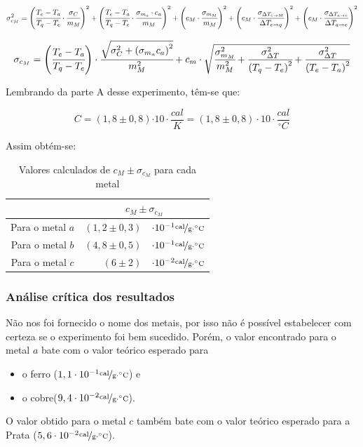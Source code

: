 \documentclass[a4paper]{article}
\providecommand{\tabularnewline}{\\}
\providecommand{\tabularnewline}{\\} %
\begin{document}
				\[
				\sigma_{c_{M}}^{2}=\left(\cfrac{T_{e}-T_{a}}{T_{q}-T_{e}}\cdot\cfrac{\sigma_{C}}{m_{M}}\right)^{2}+\left(\cfrac{T_{e}-T_{a}}{T_{q}-T_{e}}\cdot\cfrac{\sigma_{m_{a}}\cdot c_{a}}{m_{M}}\right)^{2}+\left(c_{M}\cdot\cfrac{\sigma_{m_{M}}}{m_{M}}\right)^{2}+\left(c_{M}\cdot\cfrac{\sigma_{\Delta T_{e\rightarrow M}}}{\Delta T_{e\rightarrow q}}\right)^{2}+\left(c_{M}\cdot\cfrac{\sigma_{\Delta T_{a\rightarrow e}}}{\Delta T_{a\rightarrow e}}\right)^{2}
				\]


				\begin{equation}
				\sigma_{c_{M}}=\left(\cfrac{T_{e}-T_{a}}{T_{q}-T_{e}}\right)\cdot\cfrac{\sqrt{\sigma_{C}^{2}+\left(\sigma_{m_{a}}c_{a}\right)^{2}}}{m_{M}^{2}}+c_{m}\cdot\sqrt{\cfrac{\sigma_{m_{M}}^{2}}{m_{M}^{2}}+\cfrac{\sigma_{\Delta T}^{2}}{\left(T_{q}-T_{e}\right)^{2}}+\cfrac{\sigma_{\Delta T}^{2}}{\left(T_{e}-T_{a}\right)^{2}}}
				\end{equation}


				Lembrando da parte A desse experimento, têm-se que:

				\begin{equation}
				C=\left(1,8\pm0,8\right)\unit{\cdot10\cdot\frac{cal}{K}=\left(1,8\pm0,8\right)\cdot10\cdot}\frac{cal}{^{\circ}C}
				\end{equation}


				Assim obtém-se:

				\begin{table}[!ht]
				\caption{Valores calculados de $c_{M}\pm\sigma_{c_{M}}$ para cada metal}


				\centering{}%
				\begin{tabular}{|c|rl|}
				\cline{2-3} 
				\multicolumn{1}{c|}{} & \multicolumn{2}{c|}{$c_{M}\pm\sigma_{c_{M}}$}\tabularnewline
				\hline 
				Para o metal $a$  & $\left(1,2\pm0,3\right)$  & $\cdot10^{-1}\unitfrac{cal}{g\cdot^{\circ}C}$\tabularnewline
				\hline 
				Para o metal $b$  & $\left(4,8\pm0,5\right)$  & $\cdot10^{-1}\unitfrac{cal}{g\cdot^{\circ}C}$\tabularnewline
				\hline 
				Para o metal $c$  & $\left(6\pm2\right)$  & $\cdot10^{-2}\unitfrac{cal}{g\cdot^{\circ}C}$\tabularnewline
				\hline 
				\end{tabular}
				\end{table}

			\subsubsection{Análise crítica dos resultados}

				Não nos foi fornecido o nome dos metais, por isso não é possível estabelecer
				com certeza se o experimento foi bem sucedido. Porém, o valor encontrado
				para o metal $a$ bate com o valor teórico esperado para 
				\begin{itemize}
				\item o ferro ($1,1\cdot10^{-1}\unitfrac{cal}{g\cdot^{\circ}C}$) e 
				\item o cobre($9,4\cdot10^{-2}\unitfrac{cal}{g\cdot^{\circ}C}$). 
				\end{itemize}
				O valor obtido para o metal $c$ também bate com o valor teórico esperado
				para a Prata ($5,6\cdot10^{-2}\unitfrac{cal}{g\cdot^{\circ}C}$).
\end{document}

